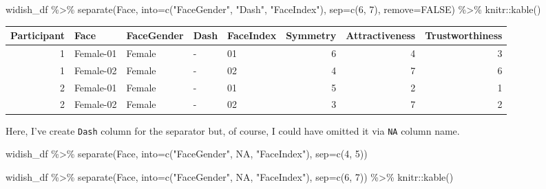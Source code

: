 \documentclass[
]{book}
\newenvironment{Shaded}{\begin{snugshade}}{\end{snugshade}}
\newcommand{\AttributeTok}[1]{\textcolor[rgb]{0.77,0.63,0.00}{#1}}
\newcommand{\ConstantTok}[1]{\textcolor[rgb]{0.00,0.00,0.00}{#1}}
\newcommand{\DecValTok}[1]{\textcolor[rgb]{0.00,0.00,0.81}{#1}}
\newcommand{\FunctionTok}[1]{\textcolor[rgb]{0.00,0.00,0.00}{#1}}
\newcommand{\NormalTok}[1]{#1}
\newcommand{\SpecialCharTok}[1]{\textcolor[rgb]{0.00,0.00,0.00}{#1}}
\newcommand{\StringTok}[1]{\textcolor[rgb]{0.31,0.60,0.02}{#1}}
\begin{document}
\begin{Shaded}
\begin{Highlighting}[]
\NormalTok{widish\_df }\SpecialCharTok{\%\textgreater{}\%}
  \FunctionTok{separate}\NormalTok{(Face, }\AttributeTok{into=}\FunctionTok{c}\NormalTok{(}\StringTok{"FaceGender"}\NormalTok{, }\StringTok{"Dash"}\NormalTok{, }\StringTok{"FaceIndex"}\NormalTok{), }\AttributeTok{sep=}\FunctionTok{c}\NormalTok{(}\DecValTok{6}\NormalTok{, }\DecValTok{7}\NormalTok{), }\AttributeTok{remove=}\ConstantTok{FALSE}\NormalTok{) }\SpecialCharTok{\%\textgreater{}\%}
\NormalTok{  knitr}\SpecialCharTok{::}\FunctionTok{kable}\NormalTok{()}
\end{Highlighting}
\end{Shaded}

\begin{tabular}{r|l|l|l|l|r|r|r}
\hline
Participant & Face & FaceGender & Dash & FaceIndex & Symmetry & Attractiveness & Trustworthiness\\
\hline
1 & Female-01 & Female & - & 01 & 6 & 4 & 3\\
\hline
1 & Female-02 & Female & - & 02 & 4 & 7 & 6\\
\hline
2 & Female-01 & Female & - & 01 & 5 & 2 & 1\\
\hline
2 & Female-02 & Female & - & 02 & 3 & 7 & 2\\
\hline
\end{tabular}

Here, I've create \texttt{Dash} column for the separator but, of course, I could have omitted it via \texttt{NA} column name.

\begin{Shaded}
\begin{Highlighting}[]
\NormalTok{widish\_df }\SpecialCharTok{\%\textgreater{}\%}
  \FunctionTok{separate}\NormalTok{(Face, }\AttributeTok{into=}\FunctionTok{c}\NormalTok{(}\StringTok{"FaceGender"}\NormalTok{, }\ConstantTok{NA}\NormalTok{, }\StringTok{"FaceIndex"}\NormalTok{), }\AttributeTok{sep=}\FunctionTok{c}\NormalTok{(}\DecValTok{4}\NormalTok{, }\DecValTok{5}\NormalTok{))}
\end{Highlighting}
\end{Shaded}

\begin{Shaded}
\begin{Highlighting}[]
\NormalTok{widish\_df }\SpecialCharTok{\%\textgreater{}\%}
  \FunctionTok{separate}\NormalTok{(Face, }\AttributeTok{into=}\FunctionTok{c}\NormalTok{(}\StringTok{"FaceGender"}\NormalTok{, }\ConstantTok{NA}\NormalTok{, }\StringTok{"FaceIndex"}\NormalTok{), }\AttributeTok{sep=}\FunctionTok{c}\NormalTok{(}\DecValTok{6}\NormalTok{, }\DecValTok{7}\NormalTok{)) }\SpecialCharTok{\%\textgreater{}\%}
\NormalTok{  knitr}\SpecialCharTok{::}\FunctionTok{kable}\NormalTok{()}
\end{Highlighting}
\end{Shaded}
\end{document}
